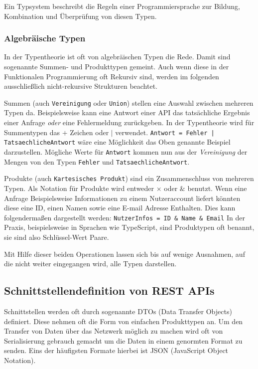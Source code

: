 Ein Typsystem beschreibt die Regeln einer Programmiersprache zur Bildung, Kombination und Überprüfung von diesen Typen.

\subsubsection{Algebräische Typen} \label{sec:algebraic-types}

In der Typentheorie ist oft von algebräischen Typen die Rede. Damit sind sogenannte Summen- und Produkttypen gemeint.
Auch wenn diese in der Funktionalen Programmierung oft Rekursiv sind, werden im folgenden ausschließlich nicht-rekursive
Strukturen beachtet. \cite{https://doi.org/10.1002/spe.1058}

Summen (auch \texttt{Vereinigung} oder \texttt{Union}) stellen eine Auswahl zwischen mehreren Typen da.\cite{288374} Beispielsweise kann eine Antwort einer API das tatsächliche
Ergebnis einer Anfrage \textit{oder} eine Fehlermeldung zurückgeben. In der Typentheorie wird für Summentypen das $+$ Zeichen oder $|$ verwendet.
\lstinline{Antwort = Fehler | TatsaechlicheAntwort} wäre eine Möglichkeit das Oben genannte Beispiel darzustellen.
Mögliche Werte für \lstinline{Antwort} kommen nun aus der \textit{Vereinigung} der Mengen von den Typen 
\lstinline{Fehler} und \lstinline{TatsaechlicheAntwort}.

Produkte (auch \texttt{Kartesisches Produkt}) sind ein Zusammenschluss von mehreren Typen.
Als Notation für Produkte wird entweder $\times$ oder $\&$ benutzt.
Wenn eine Anfrage Beispielsweise Informationen zu einem Nutzeraccount liefert könnten
diese eine ID, einen Namen sowie eine E-mail Adresse Enthalten.
Dies kann folgendermaßen dargestellt werden: \lstinline{NutzerInfos = ID & Name & Email}
In der Praxis, beispielsweise in Sprachen wie TypeScript, sind Produktypen oft benannt, sie sind also Schlüssel-Wert Paare.\cite{https://doi.org/10.1002/spe.1058}

Mit Hilfe dieser beiden Operationen lassen sich bis auf wenige Ausnahmen, auf die nicht weiter eingegangen wird, alle Typen darstellen.\cite{10.1145/2633628.2633634}

\subsection{Schnittstellendefinition von REST APIs}

Schnittstellen werden oft durch sogenannte DTOs (Data Transfer Objects) definiert. Diese nehmen oft die Form von einfachen Produkttypen an.
Um den Transfer von Daten über das Netzwerk möglich zu machen wird oft von Serialisierung gebrauch gemacht um die Daten in einem genormten 
Format zu senden.\cite{Monday2003} Eins der häufigsten Formate hierbei ist JSON (JavaScript Object Notation).

